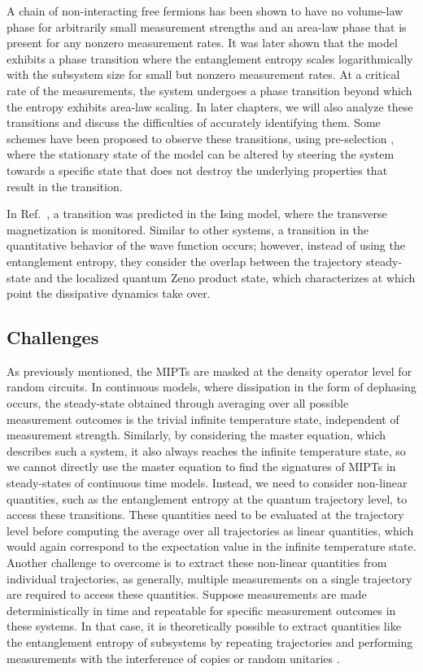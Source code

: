 A chain of non-interacting free fermions has been shown to have no volume-law phase for arbitrarily small measurement strengths \cite{cao2019} and an area-law phase that is present for any nonzero measurement rates. It was later shown \cite{alberton2021} that the model exhibits a phase transition where the entanglement entropy scales logarithmically with the subsystem size for small but nonzero measurement rates. At a critical rate of the measurements, the system undergoes a phase transition beyond which the entropy exhibits area-law scaling. In later chapters, we will also analyze these transitions and discuss the difficulties of accurately identifying them. Some schemes have been proposed to observe these transitions, using pre-selection \cite{buchhold2022}, where the stationary state of the model can be altered by steering the system towards a specific state that does not destroy the underlying properties that result in the transition.

In Ref.~\cite{doggen2022}, a transition was predicted in the Ising model, where the transverse magnetization is monitored. Similar to other systems, a transition in the quantitative behavior of the wave function occurs; however, instead of using the entanglement entropy, they consider the overlap between the trajectory steady-state and the localized quantum Zeno product state, which characterizes at which point the dissipative dynamics take over.

\subsection{Challenges}

As previously mentioned, the MIPTs are masked at the density operator level for random circuits. In continuous models, where dissipation in the form of dephasing occurs, the steady-state obtained through averaging over all possible measurement outcomes is the trivial infinite temperature state, independent of measurement strength. Similarly, by considering the master equation, which describes such a system, it also always reaches the infinite temperature state, so we cannot directly use the master equation to find the signatures of MIPTs in steady-states of continuous time models. Instead, we need to consider non-linear quantities, such as the entanglement entropy at the quantum trajectory level, to access these transitions. These quantities need to be evaluated at the trajectory level before computing the average over all trajectories as linear quantities, which would again correspond to the expectation value in the infinite temperature state. Another challenge to overcome is to extract these non-linear quantities from individual trajectories, as generally, multiple measurements on a single trajectory are required to access these quantities. Suppose measurements are made deterministically in time and repeatable for specific measurement outcomes in these systems. In that case, it is theoretically possible to extract quantities like the entanglement entropy of subsystems by repeating trajectories and performing measurements with the interference of copies \cite{islam2015, daley2012} or random unitaries \cite{elben2018, brydges2019}. 


